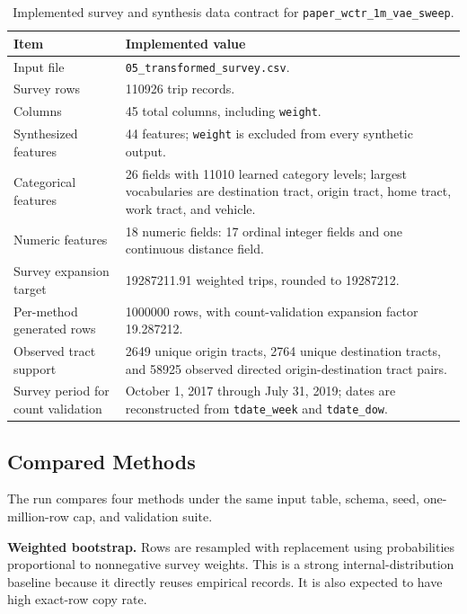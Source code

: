 \documentclass[3p,times,procedia]{elsarticle}
\begin{document}
\begin{table}[H]
\centering
\caption{Implemented survey and synthesis data contract for \texttt{paper\_wctr\_1m\_vae\_sweep}.}
\label{tab:data-contract}
\footnotesize
\begin{tabularx}{\linewidth}{lX}
\toprule
\textbf{Item} & \textbf{Implemented value} \\
\midrule
Input file & \texttt{05\_transformed\_survey.csv}. \\
Survey rows & \num{110926} trip records. \\
Columns & \num{45} total columns, including \texttt{weight}. \\
Synthesized features & \num{44} features; \texttt{weight} is excluded from every synthetic output. \\
Categorical features & \num{26} fields with \num{11010} learned category levels; largest vocabularies are destination tract, origin tract, home tract, work tract, and vehicle. \\
Numeric features & \num{18} numeric fields: \num{17} ordinal integer fields and one continuous distance field. \\
Survey expansion target & \num{19287211.91} weighted trips, rounded to \num{19287212}. \\
Per-method generated rows & \num{1000000} rows, with count-validation expansion factor \num{19.287212}. \\
Observed tract support & \num{2649} unique origin tracts, \num{2764} unique destination tracts, and \num{58925} observed directed origin-destination tract pairs. \\
Survey period for count validation & October 1, 2017 through July 31, 2019; dates are reconstructed from \texttt{tdate\_week} and \texttt{tdate\_dow}. \\
\bottomrule
\end{tabularx}
\end{table}

\subsection{Compared Methods}
The run compares four methods under the same input table, schema, seed, one-million-row cap, and validation suite.

\textbf{Weighted bootstrap.} Rows are resampled with replacement using probabilities proportional to nonnegative survey weights. This is a strong internal-distribution baseline because it directly reuses empirical records. It is also expected to have high exact-row copy rate.
\end{document}
